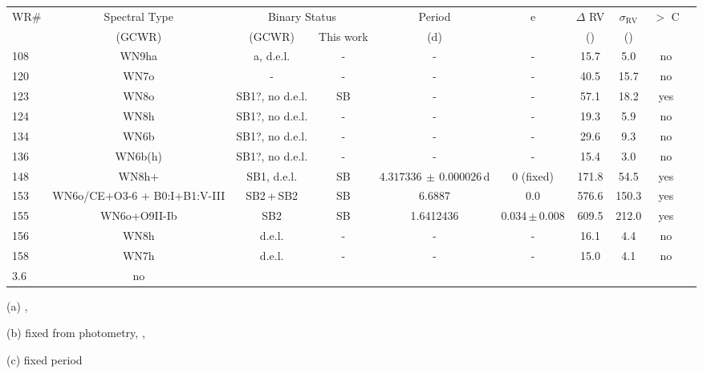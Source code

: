 \begin{table}
\begin{threeparttable}
\begin{tabular*}{\textwidth}{l @{\extracolsep{\fill}}*{9}{c}}
WR\# & Spectral Type & \multicolumn{2}{c}{Binary Status} & Period & e & $\Delta$ RV  & $\sigma_{\textrm{RV}}$ & \DelRV{} $>$ C\\
 & (GCWR) & (GCWR) & This work & (d) & &(\kms{}) &(\kms{}) &  \\ \midrule
108 & WN9ha & a, d.e.l. & - & - & - & 15.7 & 5.0 & no\\
120 & WN7o & - & - & - & - & 40.5 & 15.7 & no\\
123 & WN8o & SB1?, no d.e.l. & SB & - & - & 57.1 & 18.2 & yes\\
124 & WN8h & SB1?, no d.e.l. & - & - & - & 19.3 & 5.9 & no\\
134 & WN6b & SB1?, no d.e.l. & - & - & - & 29.6 & 9.3 & no\\
136 & WN6b(h) & SB1?, no d.e.l. & - & - & - & 15.4 & 3.0 & no\\
148 & WN8h+ & SB1, d.e.l. & SB & $4.317336\,\pm\,0.000026\,$d\tnote{(a)} & 0 (fixed)\tnote{(a)} & 171.8 & 54.5 & yes\\
153 & WN6o/CE+O3-6 + B0:I+B1:V-III  & SB2\,+\,SB2 & SB & 6.6887\tnote{(b)} & 0.0\tnote{(b)} & 576.6 & 150.3 & yes\\
155 & WN6o+O9II-Ib & SB2 & SB & 1.6412436\tnote{(c)} & 0.034\,$\pm$\,0.008\tnote{(c)} & 609.5 & 212.0 & yes\\
156 & WN8h & d.e.l. & - & - & - & 16.1 & 4.4 & no\\
158 & WN7h & d.e.l. & - & - & - & 15.0 & 4.1 & no\\3.6 & no\\
\bottomrule
\end{tabular*}
\begin{tablenotes}[para]
    \item[(a)] \citep{munoz_wr_2017},
    \item[(b)] fixed from photometry, \citet{demers_quadruple_2002},
    \item[(c)] \citet{marchenko_wind-wind_1995} fixed period
\end{tablenotes}
\end{threeparttable}
\label{tab:WNL_data}
\end{table}

